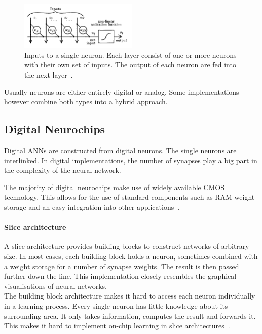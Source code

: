 \documentclass[conference]{IEEEtran}
\begin{document}
    \begin{figure}[h]
        \centering
        \includegraphics[width=0.5\textwidth]{resources/network-layer.png}
        \caption{Inputs to a single neuron.
        Each layer consist of one or more neurons with their own set of inputs.
        The output of each neuron are fed into the next layer~\cite[Fig.~1]{ms1990digital}.}
        \label{fig:layer}
    \end{figure}

    Usually neurons are either entirely digital or analog.
    Some implementations however combine both types into a hybrid approach.

    \subsection{Digital Neurochips}


    Digital ANNs are constructed from digital neurons.
    The single neurons are interlinked.
    In digital implementations, the number of synapses play a big part in the complexity of the neural network.

    The majority of digital neurochips make use of widely available CMOS technology.
    This allows for the use of standard components such as RAM weight storage and an easy integration into other applications~\cite{dias2004artificial}.

    \paragraph{Slice architecture}
    A slice architecture provides building blocks to construct networks of arbitrary size.
    In most cases, each building block holds a neuron, sometimes combined with a weight storage for a number of synapse weights.
    The result is then passed further down the line.
    This implementation closely resembles the graphical visualisations of neural networks.\\
    The building block architecture makes it hard to access each neuron individually in a learning process.
    Every single neuron has little knowledge about its surrounding area.
    It only takes information, computes the result and forwards it.
    This makes it hard to implement on-chip learning in slice architectures~\cite{dias2004artificial}.
\end{document}
